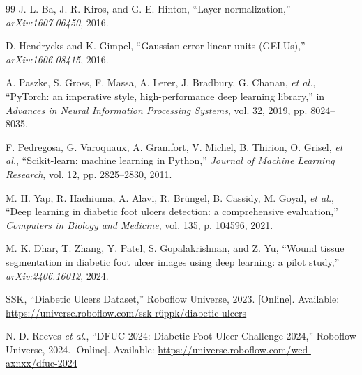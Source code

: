 \begin{thebibliography}{99}
J. L. Ba, J. R. Kiros, and G. E. Hinton, ``Layer normalization,''
\emph{arXiv:1607.06450}, 2016.

D. Hendrycks and K. Gimpel, ``Gaussian error linear units (GELUs),''
\emph{arXiv:1606.08415}, 2016.

A. Paszke, S. Gross, F. Massa, A. Lerer, J. Bradbury, G. Chanan,
\emph{et al.}, ``PyTorch: an imperative style, high-performance deep
learning library,'' in \emph{Advances in Neural Information Processing
Systems}, vol. 32, 2019, pp. 8024--8035.

F. Pedregosa, G. Varoquaux, A. Gramfort, V. Michel, B. Thirion,
O. Grisel, \emph{et al.}, ``Scikit-learn: machine learning in Python,''
\emph{Journal of Machine Learning Research}, vol. 12, pp. 2825--2830, 2011.

M. H. Yap, R. Hachiuma, A. Alavi, R. Br\"{u}ngel, B. Cassidy, M. Goyal,
\emph{et al.}, ``Deep learning in diabetic foot ulcers detection: a
comprehensive evaluation,'' \emph{Computers in Biology and Medicine},
vol. 135, p. 104596, 2021.

M. K. Dhar, T. Zhang, Y. Patel, S. Gopalakrishnan, and Z. Yu, ``Wound
tissue segmentation in diabetic foot ulcer images using deep learning: a
pilot study,'' \emph{arXiv:2406.16012}, 2024.

SSK, ``Diabetic Ulcers Dataset,'' Roboflow Universe, 2023. [Online].
Available: \url{https://universe.roboflow.com/ssk-r6ppk/diabetic-ulcers}

N. D. Reeves \emph{et al.}, ``DFUC 2024: Diabetic Foot Ulcer Challenge
2024,'' Roboflow Universe, 2024. [Online]. Available:
\url{https://universe.roboflow.com/wed-axnxx/dfuc-2024}

\end{thebibliography}
